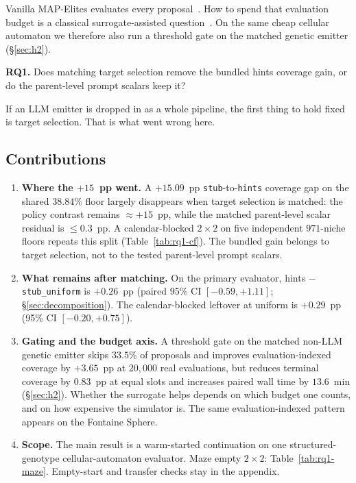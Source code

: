 \documentclass[preprint,12pt]{elsarticle}
\begin{document}
Vanilla MAP-Elites evaluates every proposal~\cite{mouret2015illuminating}. How to spend that evaluation budget is a classical surrogate-assisted question~\cite{jin2005fitness,gaier2018sail}. On the same cheap cellular automaton we therefore also run a threshold gate on the matched genetic emitter (\S\ref{sec:h2}).

\textbf{RQ1.} Does matching target selection remove the bundled hints coverage gain, or do the parent-level prompt scalars keep it?

If an LLM emitter is dropped in as a whole pipeline, the first thing to hold fixed is target selection. That is what went wrong here.

\subsection{Contributions}

\begin{enumerate}
  \item \textbf{Where the $+15$~pp went.} A $+15.09$~pp \texttt{stub}-to-\texttt{hints} coverage gap on the shared $38.84\%$ floor largely disappears when target selection is matched: the policy contrast remains ${\approx}{+}15$~pp, while the matched parent-level scalar residual is ${\le}0.3$~pp. A calendar-blocked $2\times2$ on five independent $971$-niche floors repeats this split (Table~\ref{tab:rq1-cf}). The bundled gain belongs to target selection, not to the tested parent-level prompt scalars.
  \item \textbf{What remains after matching.} On the primary evaluator, hints $-$ \texttt{stub\_uniform} is $+0.26$~pp (paired 95\% CI $[-0.59,+1.11]$; \S\ref{sec:decomposition}). The calendar-blocked leftover at uniform is $+0.29$~pp (95\% CI $[-0.20,+0.75]$).
  \item \textbf{Gating and the budget axis.} A threshold gate on the matched non-LLM genetic emitter skips $33.5\%$ of proposals and improves evaluation-indexed coverage by $+3.65$~pp at $20{,}000$ real evaluations, but reduces terminal coverage by $0.83$~pp at equal slots and increases paired wall time by $13.6$~min (\S\ref{sec:h2}). Whether the surrogate helps depends on which budget one counts, and on how expensive the simulator is. The same evaluation-indexed pattern appears on the Fontaine Sphere.
  \item \textbf{Scope.} The main result is a warm-started continuation on one structured-genotype cellular-automaton evaluator. Maze empty $2\times2$: Table~\ref{tab:rq1-maze}. Empty-start and transfer checks stay in the appendix.
\end{enumerate}
\end{document}
